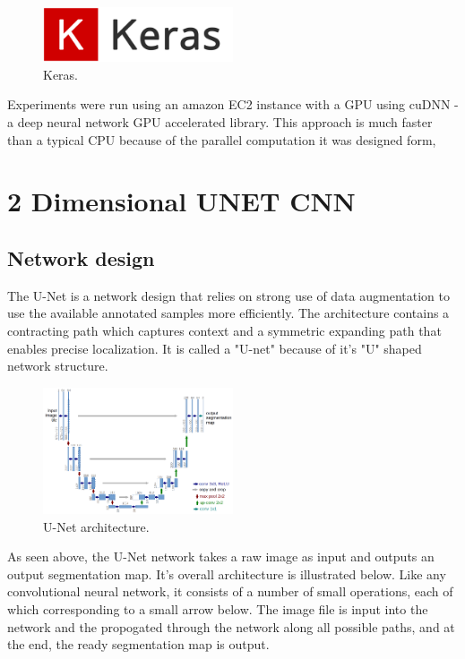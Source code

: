 \documentclass[letterpaper]{article}
\begin{document}
 \begin{figure}[H]
  \centerline{\includegraphics[width=0.5\textwidth]{Images/Keras.png}}
  \caption{Keras.}
  \label{fig:keras}
\end{figure}

Experiments were run using an amazon EC2 instance with a GPU using cuDNN - a deep neural network GPU accelerated library. This approach is much faster than a typical CPU because of the parallel computation it was designed form,

\section{2 Dimensional UNET CNN}

\subsection{Network design}
The U-Net is a network design that relies on strong use of data augmentation to use the available annotated samples more efficiently. The architecture contains a contracting path which captures context and a symmetric expanding path that enables precise localization. It is called a "U-net" because of it's "U" shaped network structure.


 \begin{figure}[H]
  \centerline{\includegraphics[width=0.5\textwidth]{Images/UNET.png}}
  \caption{U-Net architecture.}
  \label{fig:unet}
\end{figure}

As seen above, the U-Net network takes a raw image as input and outputs an output segmentation map. 
It's overall architecture is illustrated below. Like any convolutional neural network, it consists of a number of small operations, each of which corresponding to a small arrow below. The image file is input into the network and the propogated through the network along all possible paths,  and at the end, the ready segmentation map is output.
\end{document}
